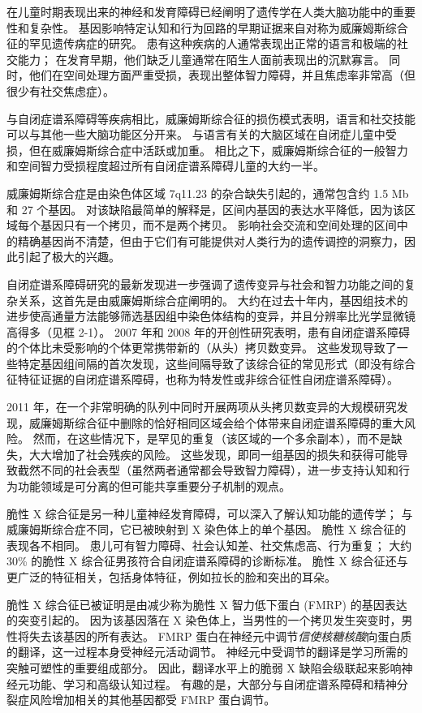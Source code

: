 在儿童时期表现出来的神经和发育障碍已经阐明了遗传学在人类大脑功能中的重要性和复杂性。 
基因影响特定认知和行为回路的早期证据来自对称为威廉姆斯综合征的罕见遗传病症的研究。 
患有这种疾病的人通常表现出正常的语言和极端的社交能力； 
在发育早期，他们缺乏儿童通常在陌生人面前表现出的沉默寡言。 
同时，他们在空间处理方面严重受损，表现出整体智力障碍，并且焦虑率非常高（但很少有社交焦虑症）。


与自闭症谱系障碍等疾病相比，威廉姆斯综合征的损伤模式表明，语言和社交技能可以与其他一些大脑功能区分开来。 
与语言有关的大脑区域在自闭症儿童中受损，但在威廉姆斯综合症中活跃或加重。 
相比之下，威廉姆斯综合征的一般智力和空间智力受损程度超过所有自闭症谱系障碍儿童的大约一半。


威廉姆斯综合症是由染色体区域 7q11.23 的杂合缺失引起的，通常包含约 1.5 Mb 和 27 个基因。 
对该缺陷最简单的解释是，区间内基因的表达水平降低，因为该区域每个基因只有一个拷贝，而不是两个拷贝。 
影响社会交流和空间处理的区间中的精确基因尚不清楚，但由于它们有可能提供对人类行为的遗传调控的洞察力，因此引起了极大的兴趣。


自闭症谱系障碍研究的最新发现进一步强调了遗传变异与社会和智力功能之间的复杂关系，这首先是由威廉姆斯综合症阐明的。 
大约在过去十年内，基因组技术的进步使高通量方法能够筛选基因组中染色体结构的变异，并且分辨率比光学显微镜高得多（见框 2-1）。 
2007 年和 2008 年的开创性研究表明，患有自闭症谱系障碍的个体比未受影响的个体更常携带新的（从头）拷贝数变异。 
这些发现导致了一些特定基因组间隔的首次发现，这些间隔导致了该综合征的常见形式（即没有综合征特征证据的自闭症谱系障碍，也称为特发性或非综合征性自闭症谱系障碍）。


2011 年，在一个非常明确的队列中同时开展两项从头拷贝数变异的大规模研究发现，威廉姆斯综合征中删除的恰好相同区域会给个体带来自闭症谱系障碍的重大风险。 
然而，在这些情况下，是罕见的重复（该区域的一个多余副本），而不是缺失，大大增加了社会残疾的风险。 
这些发现，即同一组基因的损失和获得可能导致截然不同的社会表型（虽然两者通常都会导致智力障碍），进一步支持认知和行为功能领域是可分离的但可能共享重要分子机制的观点。


脆性 X 综合征是另一种儿童神经发育障碍，可以深入了解认知功能的遗传学； 与威廉姆斯综合症不同，它已被映射到 X 染色体上的单个基因。 
脆性 X 综合征的表现各不相同。 
患儿可有智力障碍、社会认知差、社交焦虑高、行为重复； 
大约 30\% 的脆性 X 综合征男孩符合自闭症谱系障碍的诊断标准。 
脆性 X 综合征还与更广泛的特征相关，包括身体特征，例如拉长的脸和突出的耳朵。


脆性 X 综合征已被证明是由减少称为脆性 X 智力低下蛋白 (FMRP) 的基因表达的突变引起的。 
因为该基因落在 X 染色体上，当男性的一个拷贝发生突变时，男性将失去该基因的所有表达。 
FMRP 蛋白在神经元中调节\textit{信使核糖核酸}向蛋白质的翻译，这一过程本身受神经元活动调节。 
神经元中受调节的翻译是学习所需的突触可塑性的重要组成部分。 
因此，翻译水平上的脆弱 X 缺陷会级联起来影响神经元功能、学习和高级认知过程。 
有趣的是，大部分与自闭症谱系障碍和精神分裂症风险增加相关的其他基因都受 FMRP 蛋白调节。


